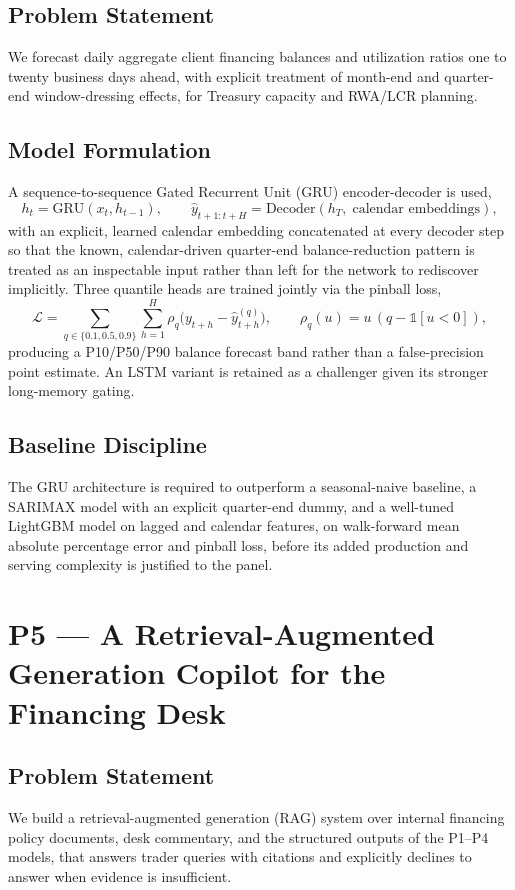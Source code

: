 \documentclass[11pt]{report}
\begin{document}
\section{Problem Statement}
We forecast daily aggregate client financing balances and utilization ratios one to twenty business
days ahead, with explicit treatment of month-end and quarter-end window-dressing effects, for
Treasury capacity and RWA/LCR planning.

\section{Model Formulation}
A sequence-to-sequence Gated Recurrent Unit (GRU) encoder-decoder is used,
\begin{equation}
h_t = \text{GRU}(x_t, h_{t-1}), \qquad \hat y_{t+1:t+H} = \text{Decoder}(h_T,\; \text{calendar embeddings}),
\end{equation}
with an explicit, learned calendar embedding concatenated at every decoder step so that the
known, calendar-driven quarter-end balance-reduction pattern is treated as an inspectable input rather
than left for the network to rediscover implicitly. Three quantile heads are trained jointly via the
pinball loss,
\begin{equation}
\mathcal{L} = \sum_{q\in\{0.1,0.5,0.9\}} \sum_{h=1}^{H} \rho_q\big(y_{t+h} - \hat y_{t+h}^{(q)}\big), \qquad \rho_q(u) = u\,(q - \mathbb{1}[u<0]),
\end{equation}
producing a P10/P50/P90 balance forecast band rather than a false-precision point estimate. An LSTM
variant is retained as a challenger given its stronger long-memory gating.

\section{Baseline Discipline}
The GRU architecture is required to outperform a seasonal-naive baseline, a SARIMAX model with an
explicit quarter-end dummy, and a well-tuned LightGBM model on lagged and calendar features, on
walk-forward mean absolute percentage error and pinball loss, before its added production and serving
complexity is justified to the panel.

\chapter{P5 --- A Retrieval-Augmented Generation Copilot for the Financing Desk}

\section{Problem Statement}
We build a retrieval-augmented generation (RAG) system over internal financing policy documents, desk
commentary, and the structured outputs of the P1--P4 models, that answers trader queries with
citations and explicitly declines to answer when evidence is insufficient.
\end{document}
